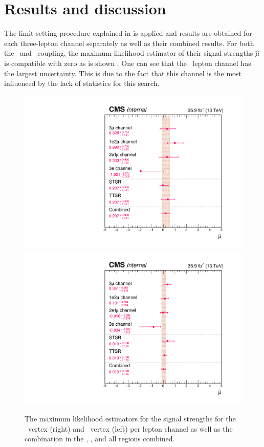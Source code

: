 \newpage
\section{Results and discussion}
\label{sec:Result}
The limit setting procedure explained in  is applied and results are obtained for each three-lepton channel separately as well as their combined results. For both the \Zut\ and \Zct\ coupling, the maximum likelihood estimator of their signal strengths $\hat{\mu}$ is compatible with zero as is shown . One can see that the \eee\ lepton channel has the largest uncertainty. This is due to the fact that this channel is the most influenced by the lack of statistics for this search.
\begin{figure}[htbp]
	\centering
	\includegraphics[width=0.49\linewidth]{6_Search/Figures/MLE/MLEZut.pdf}
	\includegraphics[width=0.49\linewidth]{6_Search/Figures/MLE/MLEZct.pdf}
	\caption{The maximum likelihood estimators for the signal strengths for the \Zut\ vertex (right) and \Zct\ vertex (left) per lepton channel as well as the combination in the \STSR, \TTSR, and all regions combined. }
	\label{fig:mlezut}
\end{figure}

